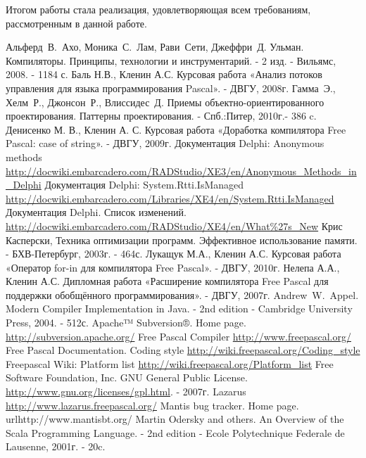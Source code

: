 \documentclass{imcs}
\begin{document}
Итогом работы стала реализация, удовлетворяющая всем требованиям, рассмотренным в данной работе.

\pagebreak

\begin{thebibliography}{99}
 Альферд~В.~Ахо, Моника~С.~Лам, Рави~Сети, Джеффри~Д. Ульман. Компиляторы. Принципы, технологии и инструментарий. - 2 изд. - Вильямс, 2008. - 1184 с.
 Баль Н.В., Кленин А.С. Курсовая работа «Анализ потоков управления для языка программирования Pascal». - ДВГУ, 2008г.
 Гамма~Э., Хелм~Р., Джонсон~Р., Влиссидес~Д. Приемы объектно-ориентированного проектирования. Паттерны проектирования. - Спб.:Питер, 2010г.- 386 c.
 Денисенко М. В., Кленин А. С. Курсовая работа «Доработка компилятора Free Pascal: case of string». - ДВГУ, 2009г.
 Документация Delphi: Anonymous methods \url{http://docwiki.embarcadero.com/RADStudio/XE3/en/Anonymous_Methods_in_Delphi}
 Документация Delphi: System.Rtti.IsManaged \url{http://docwiki.embarcadero.com/Libraries/XE4/en/System.Rtti.IsManaged}
 Документация Delphi. Список изменений. \url{http://docwiki.embarcadero.com/RADStudio/XE4/en/What\%27s\_New}
 Крис Касперски, Техника оптимизации программ. Эффективное использование памяти. - БХВ-Петербург, 2003г. - 464с.
 Лукащук М.А., Кленин А.С. Курсовая работа «Оператор for-in для компилятора Free Pascal». - ДВГУ, 2010г.
 Нелепа А.А., Кленин А.С. Дипломная работа «Расширение компилятора Free Pascal для поддержки обобщённого программирования». - ДВГУ, 2007г.
 Andrew~W.~Appel. Modern Compiler Implementation in Java. - 2nd edition - Cambridge University Press, 2004. - 512с.
 Apache™ Subversion®. Home page. \url{http://subversion.apache.org/}
 Free Pascal Compiler \url{http://www.freepascal.org/}
 Free Pascal Documentation. Coding style \url{http://wiki.freepascal.org/Coding_style}
 Freepascal Wiki: Platform list \url{http://wiki.freepascal.org/Platform_list}
 Free Software Foundation, Inc. GNU General Public License. \url{http://www.gnu.org/licenses/gpl.html}. - 2007г.
 Lazarus \url{http://www.lazarus.freepascal.org/}
 Mantis bug tracker. Home page. url{http://www.mantisbt.org/}
 Martin Odersky and others. An Overview of the Scala Programming Language. - 2nd edition - Ecole Polytechnique Federale de Lausenne, 2001г. - 20c.

\end{thebibliography}
\end{document}
